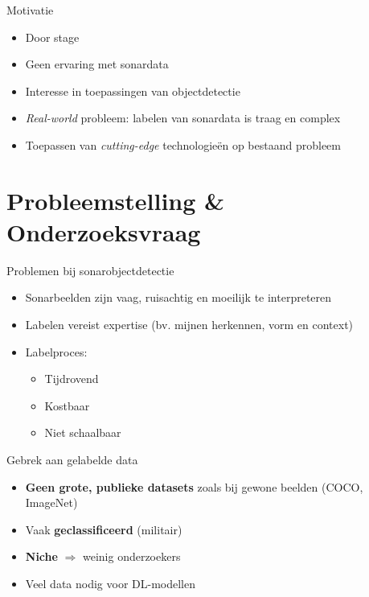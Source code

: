 \documentclass[aspectratio=169]{beamer}
\begin{document}
    \begin{frame}{Motivatie}
        \begin{itemize}
            \item Door stage
            \item Geen ervaring met sonardata
            \item Interesse in toepassingen van objectdetectie
            \item \textit{Real-world} probleem: labelen van sonardata is traag en complex
            \item Toepassen van \textit{cutting-edge} technologieën op bestaand probleem
        \end{itemize}
    \end{frame}
    
    \section{Probleemstelling \& Onderzoeksvraag}
    
    \begin{frame}{Problemen bij sonarobjectdetectie}
        \begin{itemize}
            \item Sonarbeelden zijn vaag, ruisachtig en moeilijk te interpreteren
            \item Labelen vereist expertise (bv. mijnen herkennen, vorm en context)
            \item Labelproces:
            \begin{itemize}
                \item Tijdrovend
                \item Kostbaar
                \item Niet schaalbaar
            \end{itemize}
        \end{itemize}
    \end{frame}
    
    \begin{frame}{Gebrek aan gelabelde data}
        \begin{itemize}
            \item \textbf{Geen grote, publieke datasets} zoals bij gewone beelden (COCO, ImageNet)
            \item Vaak \textbf{geclassificeerd} (militair)
            \item \textbf{Niche} $\Rightarrow$ weinig onderzoekers
            \item Veel data nodig voor DL-modellen
        \end{itemize}
    \end{frame}
    
\end{document}
